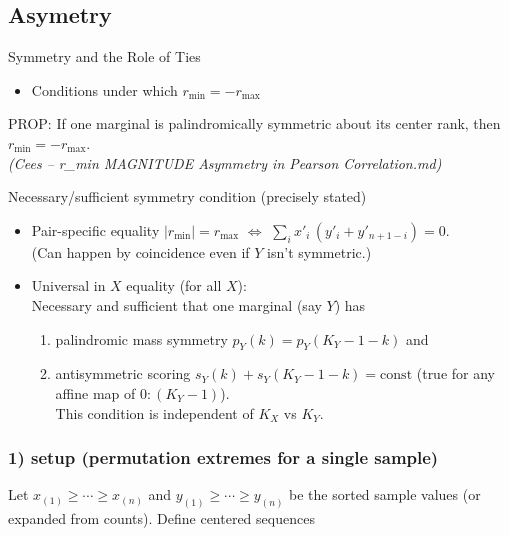 \documentclass[
  12pt,
]{article}
\providecommand{\tightlist}{%
  \setlength{\itemsep}{0pt}\setlength{\parskip}{0pt}}
\theoremstyle{plain}
\theoremstyle{definition}
\theoremstyle{remark}
\begin{document}
\subsection{Asymetry}\label{asymetry}

Symmetry and the Role of Ties

\begin{itemize}
\tightlist
\item
  Conditions under which \(r_{\min} = -r_{\max}\)
\end{itemize}

PROP: If one marginal is palindromically symmetric about its center
rank, then \(r_{\min} = -r_{\max}\).\\
\emph{(Cees -- r\_min MAGNITUDE Asymmetry in Pearson Correlation.md)}

Necessary/sufficient symmetry condition (precisely stated)

\begin{itemize}
\tightlist
\item
  Pair-specific equality \(|r_{\min}|=r_{\max}\) \(\iff\)
  \(\sum_i x'_i\,(y'_i+y'_{n+1-i})=0\).\\
  (Can happen by coincidence even if \(Y\) isn't symmetric.)
\item
  Universal in \(X\) equality (for all \(X\)):\\
  Necessary and sufficient that one marginal (say \(Y\)) has

  \begin{enumerate}
  \def\labelenumi{(\roman{enumi})}
  \tightlist
  \item
    palindromic mass symmetry \(p_Y(k)=p_Y(K_Y-1-k)\) and\\
  \item
    antisymmetric scoring \(s_Y(k)+s_Y(K_Y-1-k)=\text{const}\) (true for
    any affine map of \(0{:}(K_Y-1)\)).\\
    This condition is independent of \(K_X\) vs \(K_Y\).
  \end{enumerate}
\end{itemize}

\subsubsection{1) setup (permutation extremes for a single
sample)}\label{setup-permutation-extremes-for-a-single-sample}

Let \(x_{(1)}\ge\cdots\ge x_{(n)}\) and \(y_{(1)}\ge\cdots\ge y_{(n)}\)
be the sorted sample values (or expanded from counts). Define centered
sequences
\end{document}
